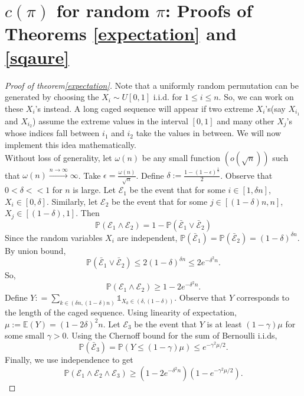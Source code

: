 \documentclass[11pt, a4paper]{article}
\theoremstyle{compact}
\begin{document}
\section{$c(\pi)$ for random $\pi$: Proofs of Theorems \ref{expectation} and \ref{sqaure}}
\begin{proof}[Proof of theorem\ref{expectation}]
 Note that a uniformly random permutation can be generated by choosing the $X_i \sim U[0,1]$ i.i.d. for $1 \leq i \leq n$. So, we can work on these $X_i$'s instead. A long caged sequence will appear if two extreme $X_i$'s(say $X_{i_1}$ and $X_{i_2} $) assume the extreme values in the interval $[0, 1]$ and many other $X_j$'s whose indices fall between $i_1$ and $i_2$ take the values in between. We will now implement this idea mathematically. \\
 Without loss of generality, let $\omega(n)$ be any small function $\left(o(\sqrt{n})\right)$ such that $\omega(n) \xrightarrow{n \rightarrow \infty } \infty$. Take $\displaystyle\epsilon = \frac{\omega(n)}{\sqrt{n}}$. Define $\delta := \displaystyle \frac{1 - (1 - \epsilon)^{\frac{1}{3}}}{2} $. Observe that $0<\delta < < 1$ for $n$ is large. Let $\mathcal{E}_1 $ be the event that for some $i \in [1, \delta n]$, $X_i \in [0, \delta ]$. Similarly, let $\mathcal{E}_2 $ be the event that for some $j \in [(1 -\delta) n, n]$, $X_j \in [(1 - \delta), 1]$. Then 
 \[
 \mathbb{P}\left( \mathcal{E}_1 \wedge \mathcal{E}_2 \right) = 1 - \mathbb{P}\left( \bar{\mathcal{E}}_1 \vee \bar{\mathcal{E}}_2 \right)
 \] 
 Since the random variables $X_i$ are independent, $ \mathbb{P}\left( \bar{\mathcal{E}}_1 \right) = \mathbb{P} \left( \bar{\mathcal{E}}_2 \right) = (1 - \delta )^{\delta n} $. By union bound,
 \[
 \mathbb{P}\left( \bar{\mathcal{E}}_1 \vee \bar{\mathcal{E}}_2 \right) \leq 2(1 - \delta )^{\delta n} \leq 2e^{-\delta^2 n}.
 \] 
 So, 
 \[
 \mathbb{P}\left( \mathcal{E}_1 \wedge \mathcal{E}_2 \right) \geq 1 -  2e^{-\delta^2 n}.
 \]
 Define $Y : = \displaystyle \sum_{k \in (\delta n, (1 - \delta)n)} \displaystyle  \mathbb{1}_{X_k \in (\delta , (1- \delta ))} $. Observe that $Y$ corresponds to the length of the caged sequence. Using linearity of expectation, $\mu := \mathbb{E}( Y) = (1 - 2\delta)^2 n$. 
 Let $\mathcal{E}_3$ be the event that $Y$ is at least $(1 - \gamma) \mu$ for some small $\gamma >0$. Using the Chernoff bound for the sum of Bernoulli i.i.ds,
 \[
 \mathbb{P}\left( \bar{\mathcal{E}}_3 \right) = \mathbb{P}\left( Y \leq (1 - \gamma)\mu  \right) \leq \displaystyle e^{-\gamma^2 \mu / 2}.
 \]
 Finally, we use independence to get  
 \[
 \mathbb{P}\left( \mathcal{E}_1 \wedge \mathcal{E}_2 \wedge \mathcal{E}_3  \right) \geq \left( 1 -  2e^{-\delta^2 n} \right) \left( 1 - e^{-\gamma^2 \mu / 2} \right).
\]
\end{proof}
\end{document}
